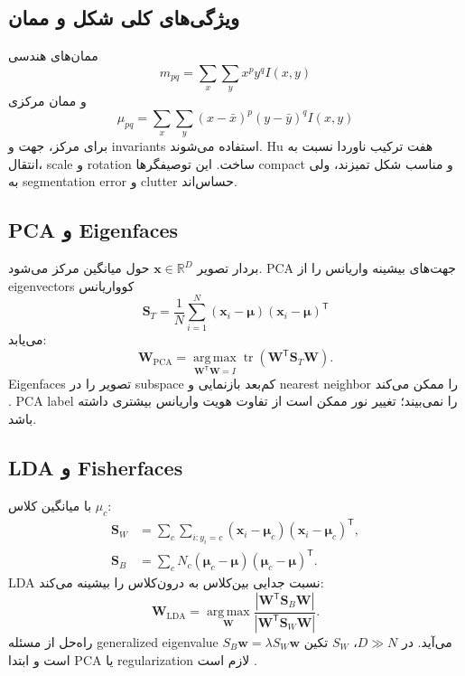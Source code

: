 \documentclass[12pt,openany,oneside]{book}
\newcommand{\R}{\mathbb{R}}
\newcommand{\trans}{^{\mathsf T}}
\newcommand{\vect}[1]{\bm{#1}}
\newcommand{\mat}[1]{\bm{#1}}
\newcommand{\argmax}{\operatorname*{arg\,max}}
\newcommand{\trace}{\operatorname{tr}}
\begin{document}
\subsection{ویژگی‌های کلی شکل و ممان}
ممان‌های هندسی
\begin{equation}
m_{pq}=\sum_x\sum_y x^py^qI(x,y)
\end{equation}
و ممان مرکزی
\begin{equation}
\mu_{pq}=\sum_x\sum_y(x-\bar x)^p(y-\bar y)^qI(x,y)
\end{equation}
برای مرکز، جهت و invariants استفاده می‌شوند. Hu هفت ترکیب ناوردا نسبت به انتقال، scale و rotation ساخت. این توصیفگرها compact و مناسب شکل تمیزند، ولی به segmentation error
و clutter حساس‌اند.

\subsection{PCA و Eigenfaces}
بردار تصویر $\vect x\in\R^D$ حول میانگین مرکز می‌شود. PCA جهت‌های بیشینه واریانس را از eigenvectors کوواریانس
\begin{equation}
\mat S_T=\frac1N\sum_{i=1}^N(\vect x_i-\vect\mu)(\vect x_i-\vect\mu)\trans
\end{equation}
می‌یابد:
\begin{equation}
\mat W_{\mathrm{PCA}}=\argmax_{\mat W\trans\mat W=I}
\trace(\mat W\trans\mat S_T\mat W).
\end{equation}
Eigenfaces تصویر را در subspace کم‌بعد بازنمایی و nearest neighbor را ممکن می‌کند \cite{turk1991}. PCA label را نمی‌بیند؛ تغییر نور ممکن است از تفاوت هویت واریانس بیشتری داشته باشد.

\subsection{LDA و Fisherfaces}
با میانگین کلاس $\mu_c$:
\begin{align}
\mat S_W&=\sum_c\sum_{i:y_i=c}(\vect x_i-\vect\mu_c)(\vect x_i-\vect\mu_c)\trans,\\
\mat S_B&=\sum_cN_c(\vect\mu_c-\vect\mu)(\vect\mu_c-\vect\mu)\trans.
\end{align}
LDA نسبت جدایی بین‌کلاس به درون‌کلاس را بیشینه می‌کند:
\begin{equation}
\mat W_{\mathrm{LDA}}=\argmax_{\mat W}
\frac{|\mat W\trans\mat S_B\mat W|}{|\mat W\trans\mat S_W\mat W|}.
\end{equation}
راه‌حل از مسئله generalized eigenvalue $S_B\vect w=\lambda S_W\vect w$ می‌آید. در $D\gg N$، $S_W$ تکین است و ابتدا PCA یا regularization لازم است
\cite{belhumeur1997}.
\end{document}
